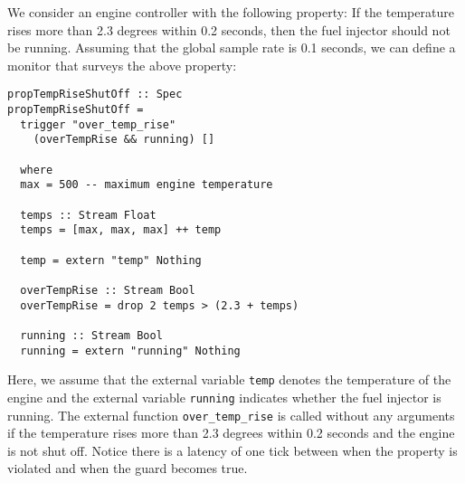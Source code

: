 \begin{example}
\label{exm:engine}
We consider an engine controller with the following property: If the temperature
rises more than 2.3 degrees within 0.2 seconds, then the fuel injector should
not be running.  Assuming that the global sample rate is 0.1 seconds, we can
define a monitor that surveys the above property:
%
\begin{lstlisting}[language = Copilot, frame = single]
propTempRiseShutOff :: Spec
propTempRiseShutOff =
  trigger "over_temp_rise"
    (overTempRise && running) []

  where
  max = 500 -- maximum engine temperature

  temps :: Stream Float
  temps = [max, max, max] ++ temp

  temp = extern "temp" Nothing

  overTempRise :: Stream Bool
  overTempRise = drop 2 temps > (2.3 + temps)

  running :: Stream Bool
  running = extern "running" Nothing
\end{lstlisting}
%

Here, we assume that the external variable {\tt temp} denotes the temperature of
the engine and the external variable {\tt running} indicates whether the fuel
injector is running.  The external function {\tt over\_temp\_rise} is called
without any arguments if the temperature rises more than 2.3 degrees within 0.2
seconds and the engine is not shut off.  Notice there is a latency of one tick between when the property is violated and when the guard becomes true.
\end{example}
